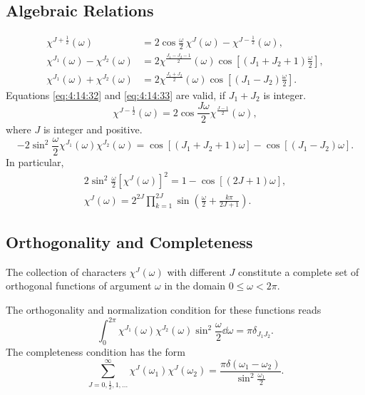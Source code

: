 \subsection{Algebraic Relations}\label{sec:4.14.6}
\begin{align}
\chi^{J+\frac{1}{2}}(\omega) & =2 \cos \frac{\omega}{2} \, \chi^{J}(\omega)-\chi^{J-\frac{1}{2}}(\omega) , \label{eq:4:14:31}\\
\chi^{J_{1}}(\omega)-\chi^{J_{2}}(\omega) & =2 \chi^{\frac{J_{1}-J_{2}-1}{2}}(\omega) \cos \left[\left(J_{1}+J_{2}+1\right) \frac{\omega}{2}\right]  ,\label{eq:4:14:32}\\
\chi^{J_{1}}(\omega)+\chi^{J_{2}}(\omega) & =2 \chi^{\frac{J_{1}+J_{2}}{2}}(\omega) \cos \left[\left(J_{1}-J_{2}\right) \frac{\omega}{2}\right] .\label{eq:4:14:33}
\end{align}
Equations \eqref{eq:4:14:32} and \eqref{eq:4:14:33} are valid, if $J_{1}+J_{2}$ is integer.
\begin{equation}
\chi^{J-\frac{1}{2}}(\omega)=2 \cos \frac{J \omega}{2} \chi^{\frac{J-1}{2}}(\omega) ,\label{eq:4:14:34}
\end{equation}
where $J$ is integer and positive.
\begin{equation}
-2 \sin ^{2} \frac{\omega}{2} \chi^{J_{1}}(\omega) \chi^{J_{2}}(\omega)=\cos \left[\left(J_{1}+J_{2}+1\right) \omega\right]-\cos \left[\left(J_{1}-J_{2}\right) \omega\right]. \label{eq:4:14:35}
\end{equation}
In particular,
\begin{gather}
2 \sin ^{2} \frac{\omega}{2}\left[\chi^{J}(\omega)\right]^{2}=1-\cos [(2 J+1) \omega], \label{eq:4:14:36}\\
\chi^{J}(\omega)=2^{2 J} \prod_{k=1}^{2 J} \sin \left(\frac{\omega}{2}+\frac{k \pi}{2 J+1}\right). \label{eq:4:14:37}
\end{gather}
\subsection{Orthogonality and Completeness}\label{sec:4.14.7}
The collection of characters $\chi^{J}(\omega)$ with different $J$ constitute a complete set of orthogonal functions of argument $\omega$ in the domain $0 \leq \omega<2 \pi$.

The orthogonality and normalization condition for these functions reads
\begin{equation}
\int_{0}^{2 \pi} \chi^{J_{1}}(\omega) \chi^{J_{2}}(\omega) \sin ^{2} \frac{\omega}{2} \dd \omega=\pi \delta_{J_{1} J_{2}} .\label{eq:4:14:38}
\end{equation}
The completeness condition has the form
\begin{equation}
\sum_{J=0, \frac{1}{2}, 1, \ldots}^{\infty} \chi^{J}\left(\omega_{1}\right) \chi^{J}\left(\omega_{2}\right)=\frac{\pi \delta\left(\omega_{1}-\omega_{2}\right)}{\sin ^{2} \frac{\omega_{1}}{2}} .\label{eq:4:14:39}
\end{equation}
